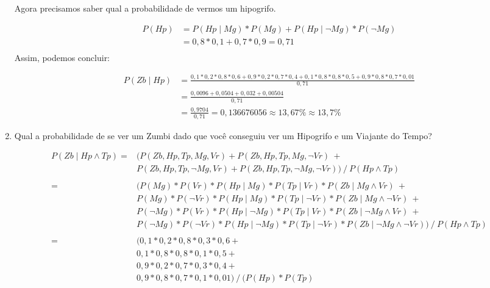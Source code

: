 \documentclass{article}
\begin{document}
\begin{enumerate}
        Agora precisamos saber qual a probabilidade de vermos um hipogrifo.

        \begin{align*}
            P(Hp) &= P(Hp \mid Mg) * P(Mg) + P(Hp \mid \neg Mg) * P(\neg Mg) \\
                  &= 0,8 * 0,1 + 0,7 * 0,9 = 0,71\\
        \end{align*}
        Assim, podemos concluir:
        
        \begin{align*}
            P(Zb \mid Hp) &= \frac{0,1 * 0,2 * 0,8 * 0,6 + 0,9 * 0,2 * 0,7 * 0,4 + 0,1 * 0,8 * 0,8 * 0,5 + 0,9 * 0,8 * 0,7 * 0,01}{0,71}\\
                       &= \frac{0,0096 + 0,0504 + 0,032 + 0,00504}{0,71}\\
                       &= \frac{0,9704}{0,71}
                        = 0,136676056 \approx 13,67\% \approx 13,7\%
        \end{align*}
        
    
    \item Qual a probabilidade de se ver um Zumbi dado que você conseguiu ver um Hipogrifo e um Viajante do Tempo?
    
        \begin{align*}
            P(Zb \mid Hp \land Tp) = &(P(Zb,Hp,Tp,Mg,Vr)+P(Zb,Hp,Tp,Mg,\neg Vr)\ + \\
	                                 &P(Zb,Hp,Tp,\neg Mg,Vr)+P(Zb,Hp,Tp,\neg Mg,\neg Vr))\ /\ P(Hp \land Tp) \\
	                                 \\
	                               = &(P(Mg)*P(Vr)*P(Hp \mid Mg)*P(Tp \mid Vr)*P(Zb \mid Mg \land Vr)\ + \\
	                                 &P(Mg)*P(\neg Vr)*P(Hp \mid Mg)*P(Tp \mid \neg Vr)*P(Zb \mid Mg \land \neg Vr)\ + \\
	                                 &P(\neg Mg)*P(Vr)*P(Hp \mid \neg Mg)*P(Tp \mid Vr)*P(Zb \mid \neg Mg \land Vr)\ + \\
	                                 &P(\neg Mg)*P(\neg Vr)*P(Hp \mid \neg Mg)*P(Tp \mid \neg Vr)*P(Zb \mid \neg Mg \land \neg Vr))\ /\ P(Hp \land Tp) \\
	                                 \\
	                               = &(0,1 * 0,2 * 0,8 * 0,3 * 0,6 + \\
	                                 &0,1 * 0,8 * 0,8 * 0,1 * 0,5 + \\
	                                 &0,9 * 0,2 * 0,7 * 0,3 * 0,4 + \\
	                                 &0,9 * 0,8 * 0,7 * 0,1 * 0,01)\ /\ (P(Hp)*P(Tp)
        \end{align*}
        

\end{enumerate}
\end{document}
